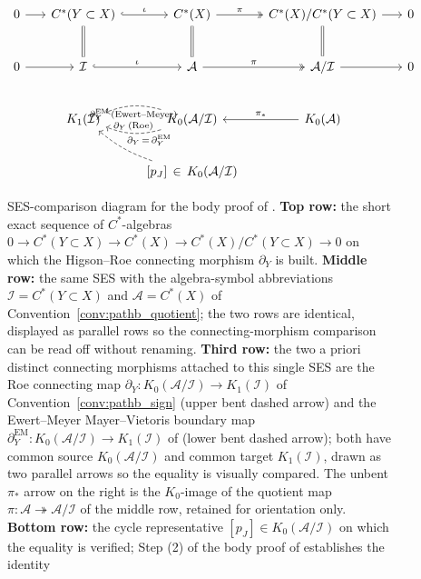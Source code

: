 \documentclass[11pt]{article}
\numberwithin{equation}{section}
\theoremstyle{definition}
\theoremstyle{remark}
\begin{document}
\begin{figure}[H]
\centering
\[
\begin{tikzcd}[row sep=2.4em, column sep=1.6em]
0 \arrow[r] & C^*(Y\subset X) \arrow[r, hook, "\iota"] \arrow[d, equal]
  & C^*(X) \arrow[r, two heads, "\pi"] \arrow[d, equal]
  & C^*(X)/C^*(Y\subset X) \arrow[r] \arrow[d, equal]
  & 0 \\
0 \arrow[r] & \mathcal I \arrow[r, hook, "\iota"]
  & \mathcal A \arrow[r, two heads, "\pi"]
  & \mathcal A/\mathcal I \arrow[r] & 0 \\
& K_1(\mathcal I)
  & K_0(\mathcal A/\mathcal I)
       \arrow[l, dashed, bend left=18, "\partial_Y\,\text{(Roe)}"']
       \arrow[l, dashed, bend right=18, "\partial^{\mathrm{EM}}_Y\,\text{(Ewert--Meyer)}"]
  & K_0(\mathcal A) \arrow[l, "\pi_*"'] \\
& & {[p_J]\,\in\,K_0(\mathcal A/\mathcal I)}
       \arrow[ul, dashed, "\partial_Y\,=\,\partial^{\mathrm{EM}}_Y"', bend left=10]
  &
\end{tikzcd}
\]
\caption{SES-comparison diagram for the body proof of
. \textbf{Top row:} the short exact sequence of \(C^*\)-algebras
\(0\to C^*(Y\subset X)\to C^*(X)\to C^*(X)/C^*(Y\subset X)\to 0\) on which the Higson--Roe
connecting morphism \(\partial_Y\) is built. \textbf{Middle row:} the same SES with the
algebra-symbol abbreviations \(\mathcal I=C^*(Y\subset X)\) and \(\mathcal A=C^*(X)\) of
Convention~\ref{conv:pathb_quotient}; the two rows are identical, displayed as parallel
rows so the connecting-morphism comparison can be read off without renaming. \textbf{Third
row:} the two a priori distinct connecting morphisms attached to this single SES are the
Roe connecting map \(\partial_Y\colon K_0(\mathcal A/\mathcal I)\to K_1(\mathcal I)\) of
Convention~\ref{conv:pathb_sign} (upper bent dashed arrow) and the Ewert--Meyer
Mayer--Vietoris boundary map \(\partial^{\mathrm{EM}}_Y\colon K_0(\mathcal A/\mathcal I)\to
K_1(\mathcal I)\) of \cite{EwertMeyer2019} (lower bent dashed arrow); both have common
source \(K_0(\mathcal A/\mathcal I)\) and common target \(K_1(\mathcal I)\), drawn as two
parallel arrows so the equality is visually compared. The unbent \(\pi_*\) arrow on the
right is the \(K_0\)-image of the quotient map \(\pi\colon\mathcal A\twoheadrightarrow
\mathcal A/\mathcal I\) of the middle row, retained for orientation only.
\textbf{Bottom row:} the cycle representative \([p_J]\in K_0(\mathcal A/\mathcal I)\) on
which the equality is verified; Step (2) of the body proof of
 establishes the identity
}
\end{figure}
\end{document}
